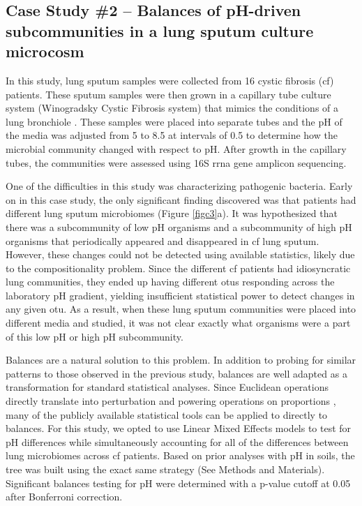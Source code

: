   \subsection{Case Study \#2 – Balances of pH-driven subcommunities in a lung sputum culture microcosm}
 In this study, lung sputum samples were collected from 16 cystic fibrosis (\gls{cf}) patients.  These sputum samples were then grown in a capillary tube culture system (Winogradsky Cystic Fibrosis system) that mimics the conditions of a lung bronchiole \cite{wincf}.  These samples were placed into separate tubes and the pH of the media was adjusted from 5 to 8.5 at intervals of 0.5 to determine how the microbial community changed with respect to pH.  After growth in the capillary tubes, the communities were assessed using 16S \gls{rrna} gene amplicon sequencing.\par
 One of the difficulties in this study was characterizing pathogenic bacteria.  Early on in this case study, the only significant finding discovered was that patients had different lung sputum microbiomes (Figure \ref{figc3}a). It was hypothesized that there was a subcommunity of low pH organisms and a subcommunity of high pH organisms that periodically appeared and disappeared in \gls{cf} lung sputum.  However, these changes could not be detected using available statistics, likely due to the compositionality problem.  Since the different \gls{cf} patients had idiosyncratic lung communities, they ended up having different \gls{otu}s responding across the laboratory pH gradient, yielding insufficient statistical power to detect changes in any given \gls{otu}.  As a result, when these lung sputum communities were placed into different media and studied, it was not clear exactly what organisms were a part of this low pH or high pH subcommunity.  \par
 Balances are a natural solution to this problem.  In addition to probing for similar patterns to those observed in the previous study, balances are well adapted as a transformation for standard statistical analyses.  Since Euclidean operations directly translate into perturbation and powering operations on proportions \cite{ilr} \cite{Pawlowsky-Glahn2015-qb}, many of the publicly available statistical tools can be applied to directly to balances.  For this study, we opted to use Linear Mixed Effects models to test for pH differences while simultaneously accounting for all of the differences between lung microbiomes across \gls{cf} patients.   Based on prior analyses with pH in soils, the tree was built using the exact same strategy (See Methods and Materials).   Significant balances testing for pH were determined with a p-value cutoff at 0.05 after Bonferroni correction.  \par

